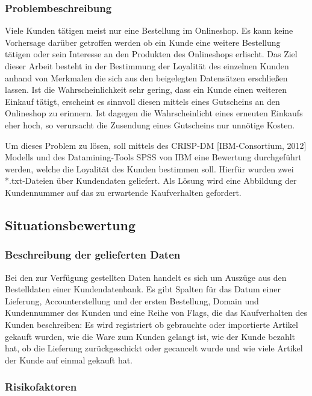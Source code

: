 \documentclass[a4paper,12pt]{article}
\begin{document}
\subsubsection{Problembeschreibung}
Viele Kunden tätigen meist nur eine Bestellung im Onlineshop. Es kann keine Vorhersage darüber getroffen werden ob ein Kunde eine weitere Bestellung tätigen oder sein Interesse an den Produkten des Onlineshops erlischt. Das Ziel dieser Arbeit besteht in der Bestimmung der Loyalität des einzelnen Kunden anhand von Merkmalen die sich aus den beigelegten Datensätzen erschließen lassen. Ist die Wahrscheinlichkeit sehr gering, dass ein Kunde einen weiteren Einkauf tätigt, erscheint es sinnvoll diesen mittels eines Gutscheins an den Onlineshop zu erinnern. Ist dagegen die Wahrscheinlicht eines erneuten Einkaufs eher hoch, so verursacht die Zusendung eines Gutscheins nur unnötige Kosten.  
\par
Um dieses Problem zu lösen, soll mittels des CRISP-DM [IBM-Consortium, 2012] Modells
und des Datamining-Tools SPSS von IBM eine Bewertung durchgeführt werden, welche die
Loyalität des Kunden bestimmen soll. Hierfür wurden zwei *.txt-Dateien über Kundendaten geliefert.
Als Lösung wird eine Abbildung der Kundennummer auf das zu erwartende Kaufverhalten gefordert. 

\subsection{Situationsbewertung}

\subsubsection{Beschreibung der gelieferten Daten}
Bei den zur Verfügung gestellten Daten  handelt es sich um Auszüge aus den Bestelldaten einer Kundendatenbank.
Es gibt Spalten für das Datum einer Lieferung, Accounterstellung und der
ersten Bestellung, Domain und Kundennummer des Kunden und eine Reihe von Flags, die das Kaufverhalten des Kunden beschreiben:
Es wird registriert ob gebrauchte oder importierte Artikel gekauft wurden, wie die Ware zum Kunden gelangt ist, wie der Kunde bezahlt hat, ob die Lieferung zurückgeschickt oder gecancelt wurde und wie viele Artikel der Kunde auf einmal gekauft hat.

\subsubsection{Risikofaktoren}
\end{document}
